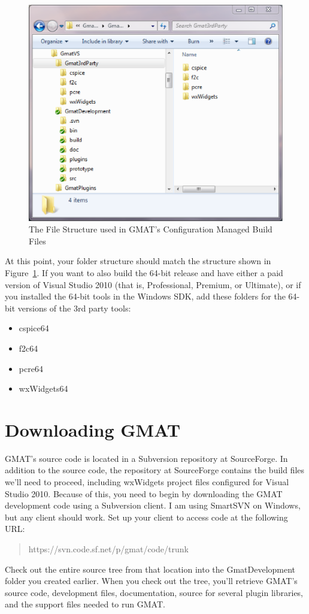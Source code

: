 \documentclass[letterpaper,10pt]{article}%
\begin{document}
{\begin{figure}
\centering
\includegraphics[scale=0.75]{FolderStructure.eps}
\caption{The File Structure used in GMAT's Configuration Managed Build Files}
\label{fig:FolderStructure}
\end{figure}


\noindent At this point, your folder structure should match the structure shown in Figure~\ref{fig:FolderStructure}.  If you want to also build the 64-bit release and have either a paid version of Visual Studio 2010 (that is, Professional, Premium, or Ultimate), or if you installed the 64-bit tools in the Windows SDK, add these folders for the 64-bit versions of the 3rd party tools:
\begin{itemize}
\item cspice64
\item f2c64
\item pcre64
\item wxWidgets64
\end{itemize}

\section{Downloading GMAT}

GMAT's source code is located in a Subversion repository at SourceForge.  In addition to the source code, the repository at SourceForge contains the build files we'll need to proceed, including wxWidgets project files configured for Visual Studio 2010.  Because of this, you need to begin by downloading the GMAT development code using a Subversion client.  I am using SmartSVN on Windows, but any client should work.  Set up your client to access code at the following URL:
\begin{quote}
https://svn.code.sf.net/p/gmat/code/trunk
\end{quote}
\noindent Check out the entire source tree from that location into the GmatDevelopment folder you created earlier.  When you check out the tree, you'll retrieve GMAT's source code, development files, documentation, source for several plugin libraries, and the support files needed to run GMAT.

}
\end{document}
